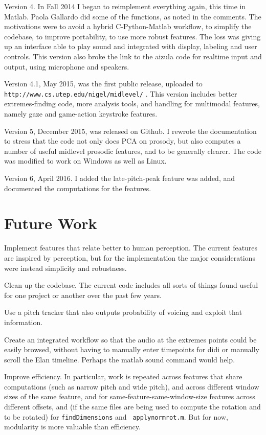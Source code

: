 \documentclass[11pt]{article}
\begin{document}
Version 4.  In Fall 2014 I began to reimplement everything again, this
time in Matlab.  Paola Gallardo did some of the functions, as noted in
the comments.  The motivations were to avoid a hybrid C-Python-Matlab
workflow, to simplify the codebase, to improve portability, to use
more robust features.  The loss was giving up an interface able to
play sound and integrated with display, labeling and user controls.
This version also broke the link to the aizula code for realtime input
and output, using microphone and speakers.

Version 4.1, May 2015, was the first public release, uploaded to {\tt
  http://www.cs.utep.edu/nigel/midlevel/} .  This version includes
better extremes-finding code, more analysis tools, and handling for
multimodal features, namely gaze and game-action keystroke features.

Version 5, December 2015, was released on Github.  I rewrote the
documentation to stress that the code not only does PCA on prosody,
but also computes a number of useful midlevel prosodic features, and
to be generally clearer.  The code was modified to work on Windows as
well as Linux.  

Version 6, April 2016.  I added the late-pitch-peak feature was added, and
documented the computations for the features.


\section{Future Work}

Implement features that relate better to human perception.  The
current features are inspired by perception, but for the
implementation the major considerations were instead simplicity and
robustness.

Clean up the codebase.  The current code includes
all sorts of things found useful for one project or another over the past
few years.

Use a pitch tracker that also outputs probability
of voicing and exploit that information.

Create an integrated workflow so that the audio at the extremes points
could be easily browsed, without having to manually enter timepoints
for didi or manually scroll the Elan timeline.  Perhaps the matlab
sound command would help.

Improve efficiency.  In particular,
work is repeated across features that share computations (such as
narrow pitch and wide pitch), and across different window sizes of the
same feature, and for same-feature-same-window-size features across
different offsets, and (if the same files are being used to compute
the rotation and to be rotated) for {\tt findDimensions} and {\tt
  applynormrot.m}.  But for now, modularity is more valuable than
efficiency.
\end{document}
